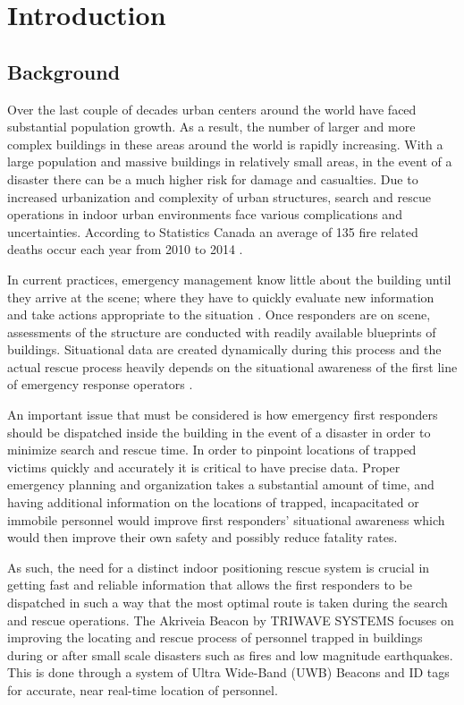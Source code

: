 
\setcounter{section}{0}
\section{Introduction}
\bigskip

\subsection{Background}
Over the last couple of decades urban centers around the world have faced substantial population growth. As a result, the number of larger and more complex buildings in these areas around the world is rapidly increasing. With a large population and massive buildings in relatively small areas, in the event of a disaster there can be a much higher risk for damage and casualties. Due to increased urbanization and complexity of urban structures, search and rescue operations in indoor urban environments face various complications and uncertainties. According to Statistics Canada an average of 135 fire related deaths occur each year from 2010 to 2014 \cite{R1}.

\bigskip
In current practices, emergency management know little about the building until they arrive at the scene; where they have to quickly evaluate new information and take actions appropriate to the situation \cite{R2}. Once responders are on scene, assessments of the structure are conducted with readily available blueprints of buildings. Situational data are created dynamically during this process and the actual rescue process heavily depends on the situational awareness of the first line of emergency response operators \cite{R3}.

\bigskip
An important issue that must be considered is how emergency first responders should be dispatched inside the building in the event of a disaster in order to minimize search and rescue time. In order to pinpoint locations of trapped victims quickly and accurately it is critical to have precise data. Proper emergency planning and organization takes a substantial amount of time, and having additional information on the locations of trapped, incapacitated or immobile personnel would improve first responders’ situational awareness which would then improve their own safety and possibly reduce fatality rates.

\bigskip
As such, the need for a distinct indoor positioning rescue system is crucial in getting fast and reliable information that allows the first responders to be dispatched in such a way that the most optimal route is taken during the search and rescue operations. The Akriveia Beacon by TRIWAVE SYSTEMS focuses on improving the locating and rescue process of personnel trapped in buildings during or after small scale disasters such as fires and low magnitude earthquakes. This is done through a system of Ultra Wide-Band (\Gls{UWB}) Beacons and \Gls{ID} tags for accurate, near real-time location of personnel.

